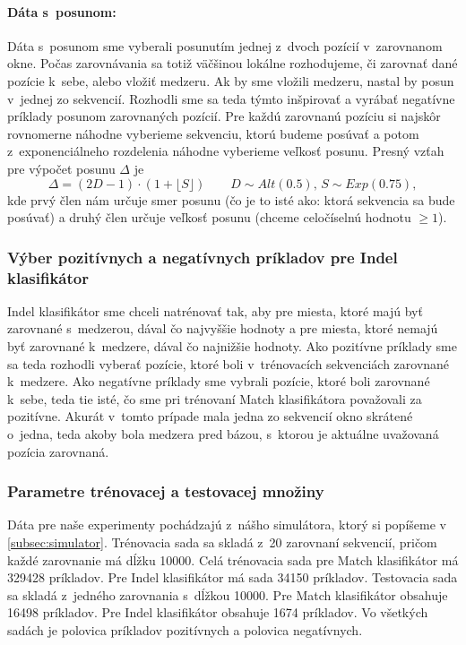 \paragraph{Dáta s~posunom:} Dáta s~posunom sme vyberali posunutím jednej z~dvoch pozícií v~zarovnanom okne.
Počas zarovnávania sa totiž väčšinou lokálne rozhodujeme, či zarovnať dané pozície k~sebe, alebo vložiť medzeru. Ak by sme vložili medzeru, nastal by posun v~jednej zo sekvencií. Rozhodli sme sa teda týmto inšpirovať a vyrábať negatívne príklady posunom zarovnaných pozícií. Pre každú zarovnanú pozíciu si najskôr rovnomerne náhodne vyberieme sekvenciu, ktorú budeme posúvať a potom z~exponenciálneho rozdelenia náhodne vyberieme veľkosť posunu. Presný vzťah pre výpočet posunu $\Delta$ je
$$\Delta = \left(2D-1\right)\cdot \left(1+\lfloor S\rfloor\right)\qquad D\sim Alt(0.5),\, S\sim Exp(0.75),$$
kde prvý člen nám určuje smer posunu (čo je to isté ako: ktorá sekvencia sa bude posúvať) a druhý člen určuje veľkosť posunu (chceme celočíselnú hodnotu $\geq 1$).

\subsubsection{Výber pozitívnych a negatívnych príkladov pre Indel klasifikátor}

Indel klasifikátor sme chceli natrénovať tak, aby pre miesta, ktoré majú byť zarovnané s~medzerou, dával čo najvyššie hodnoty a pre miesta, ktoré nemajú byť zarovnané k~medzere, dával čo najnižšie hodnoty. Ako pozitívne príklady sme sa teda rozhodli vyberať pozície, ktoré boli v~trénovacích sekvenciách zarovnané k~medzere. Ako negatívne príklady sme vybrali pozície, ktoré boli zarovnané k~sebe, teda tie isté, čo sme pri trénovaní Match klasifikátora považovali za pozitívne. Akurát v~tomto prípade mala jedna zo sekvencií okno skrátené o~jedna, teda akoby bola medzera pred bázou, s~ktorou je aktuálne uvažovaná pozícia zarovnaná.

\subsubsection{Parametre trénovacej a testovacej množiny}
\label{subsec:clf-training-sets}
Dáta pre naše experimenty pochádzajú z~nášho simulátora, ktorý si popíšeme v \ref{subsec:simulator}. Trénovacia sada sa skladá z~20 zarovnaní sekvencií, pričom každé zarovnanie má dĺžku 10000. Celá trénovacia sada pre Match klasifikátor má 329428 príkladov. Pre Indel klasifikátor má sada 34150 príkladov.
Testovacia sada sa skladá z~jedného zarovnania s~dĺžkou 10000. Pre Match klasifikátor obsahuje 16498 príkladov. Pre Indel klasifikátor obsahuje 1674 príkladov.
Vo všetkých sadách je polovica príkladov pozitívnych a polovica negatívnych.

